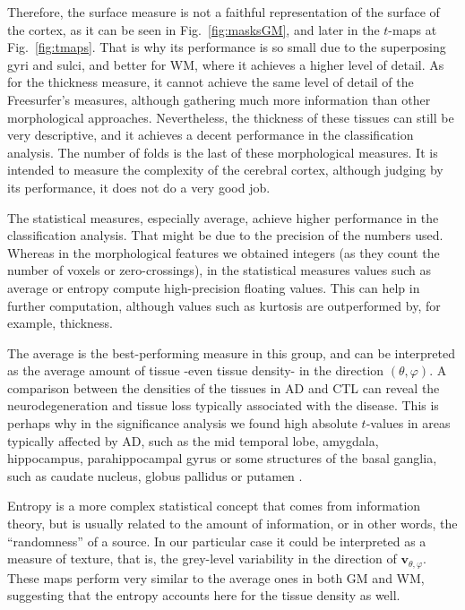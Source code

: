 Therefore, the surface measure is not a faithful representation of the surface of the cortex, as it can be seen in Fig.~\ref{fig:masksGM}, and later in the $t$-maps at Fig.~\ref{fig:tmaps}. That is why its performance is so small due to the superposing gyri and sulci, and better for \ac{WM}, where it achieves a higher level of detail. As for the thickness measure, it cannot achieve the same level of detail of the Freesurfer's measures, although gathering much more information than other morphological approaches. Nevertheless, the thickness of these tissues can still be very descriptive, and it achieves a decent performance in the classification analysis. The number of folds is the last of these morphological measures. It is intended to measure the complexity of the cerebral cortex, although judging by its performance, it does not do a very good job. 

The statistical measures, especially average, achieve higher performance in the classification analysis. That might be due to the precision of the numbers used. Whereas in the morphological features we obtained integers (as they count the number of voxels or zero-crossings), in the statistical measures values such as average or entropy compute high-precision floating values. This can help in further computation, although values such as kurtosis are outperformed by, for example, thickness. 

The average is the best-performing measure in this group, and can be interpreted as the average amount of tissue -even tissue density- in the direction $(\theta,\varphi)$. A comparison between the densities of the tissues in \ac{AD} and \ac{CTL} can reveal the neurodegeneration and tissue loss typically associated with the disease. This is perhaps why in the significance analysis we found high absolute $t$-values in areas typically affected by \ac{AD}, such as the mid temporal lobe, amygdala, hippocampus, parahippocampal gyrus or some structures of the basal ganglia, such as caudate nucleus, globus pallidus or putamen \cite{Dubois2007,Pievani2013}. 

Entropy is a more complex statistical concept that comes from information theory, but is usually related to the amount of information, or in other words, the ``randomness'' of a source. In our particular case it could be interpreted as a measure of texture, that is, the grey-level variability in the direction of $\mathbf{v}_{\theta,\varphi}$. These maps perform very similar to the average ones in both \ac{GM} and \ac{WM}, suggesting that the entropy  accounts here for the tissue density as well. 

